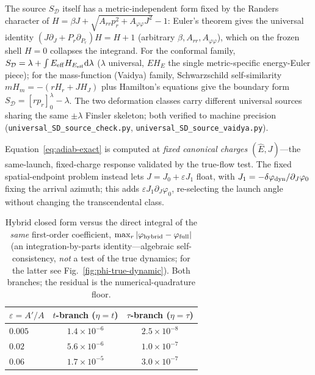 \documentclass[
    aps, prd, twocolumn, superscriptaddress,
    showpacs, nofootinbib, floatfix
]{revtex4-2}
\newcommand{\Ehat}{\hat E}
\newcommand{\dd}{\mathrm{d}}
\begin{document}
The source $S_{\mathcal D}$ itself has a metric-independent form fixed by the Randers
character of $H=\beta J+\sqrt{A_{rr}p_r^2+A_{\varphi\varphi}J^2}-1$: Euler's theorem gives
the universal identity $(J\partial_J+P_r\partial_{P_r})H=H+1$ (arbitrary
$\beta,A_{rr},A_{\varphi\varphi}$), which on the frozen shell $H=0$ collapses the
integrand. For the conformal family, $S_{\mathcal D}=\lambda+\int E_{\rm eff}H_{E_{\rm eff}}\dd\lambda$
($\lambda$ universal, $E H_E$ the single metric-specific energy-Euler piece); for the
mass-function (Vaidya) family, Schwarzschild self-similarity $m H_m=-(rH_r+JH_J)$ plus
Hamilton's equations give the boundary form $S_{\mathcal D}=[r p_r]_0^\lambda-\lambda$.
The two deformation classes carry different universal sources sharing the same
$\pm\lambda$ Finsler skeleton; both verified to machine precision
(\texttt{universal\_SD\_source\_check.py}, \texttt{universal\_SD\_source\_vaidya.py}).

Equation~\eqref{eq:adiab-exact} is
computed at \emph{fixed canonical charges} $(\Ehat,J)$---the same-launch, fixed-charge
response validated by the true-flow test. The fixed spatial-endpoint problem instead
lets $J=J_0+\varepsilon J_1$ float, with $J_1=-\delta\varphi_{\rm dyn}/\partial_J\varphi_0$
fixing the arrival azimuth; this adds $\varepsilon J_1\partial_J\varphi_0$, re-selecting
the launch angle without changing the transcendental class.
\begin{table}[htbp]
    \centering
    \caption{Hybrid closed form versus the direct integral of the \emph{same}
    first-order coefficient, $\max_r|\varphi_{\rm hybrid}-\varphi_{\rm full}|$ (an
    integration-by-parts identity---algebraic self-consistency, \emph{not} a test of
    the true dynamics; for the latter see Fig.~\ref{fig:phi-true-dynamic}).
    Both branches; the residual is the numerical-quadrature floor.}
    \label{tab:adiab-valid}
    \begin{tabular}{lcc}
        \hline\hline
        $\varepsilon=A'/A$ & $t$-branch ($\eta=t$) & $\tau$-branch ($\eta=\tau$)\\
        \hline
        $0.005$ & $1.4\times10^{-6}$ & $2.5\times10^{-8}$\\
        $0.02$  & $5.6\times10^{-6}$ & $1.0\times10^{-7}$\\
        $0.06$  & $1.7\times10^{-5}$ & $3.0\times10^{-7}$\\
        \hline\hline
    \end{tabular}
\end{table}
\end{document}
